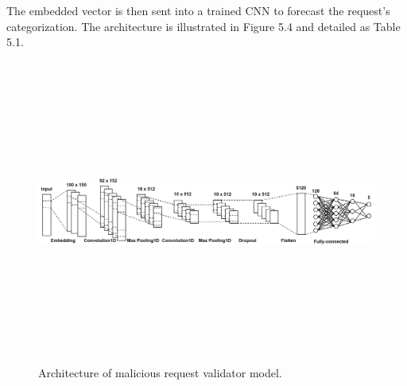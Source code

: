 The embedded vector is then sent into a trained CNN to forecast the request's categorization. The architecture is illustrated in Figure 5.4 and detailed as Table 5.1.

\begin{figure}[!h]
	\centering
	\includegraphics[width=\linewidth, height=10cm,keepaspectratio]{figures/layers.png}
  \caption{Architecture of malicious request validator model.}
\end{figure} 

